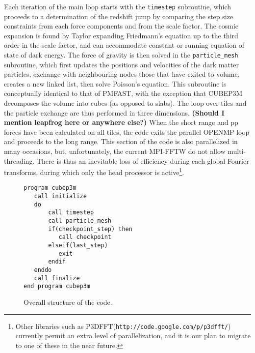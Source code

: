Each iteration of the main loop starts with the {\tt timestep} subroutine, 
which proceeds to a determination of the redshift jump by comparing the step size constraints from each
force components and from the scale factor.
The cosmic expansion is found by Taylor expanding Friedmann's equation up to the third order in the scale factor,
and can accommodate constant or running equation of state of dark energy.
The force of gravity is then solved  in the {\tt particle\_mesh} subroutine,
which first updates the positions and velocities of the dark matter particles, exchange with neighbouring nodes those that have exited to volume,
creates a new linked list, then solve Poisson's equation.  This subroutine is conceptually identical to that of {\small PMFAST}, 
with the exception  that {\small CUBEP3M} decomposes the volume into cubes (as opposed to slabs). 
The loop over tiles and the particle exchange are thus performed in three dimensions.
{\bf (Should I mention leapfrog here or anywhere else?)}
When the short range and pp forces have been calculated on all tiles, the code exits the parallel {\small OPENMP} loop
and proceeds to the long range. This section of the code is also parallelized in many occasions, but, unfortunately, the current {\small MPI-FFTW}
do not allow multi-threading. There is thus an inevitable loss of efficiency during each global Fourier transforms, during which
only the head processor is active\footnote{Other libraries such as {\small P3DFFT}({\tt http://code.google.com/p/p3dfft/}) currently permit
 an extra level of parallelization, and it is our plan to migrate to one of these in the near future.}.

\begin{figure}
\begin{verbatim}
program cubep3m
   call initialize
   do
       call timestep
       call particle_mesh
       if(checkpoint_step) then
          call checkpoint
       elseif(last_step)
          exit
       endif
   enddo
   call finalize
end program cubep3m
\end{verbatim}
\caption{Overall structure of the code.}
\label{fig:structure}
\end{figure}

